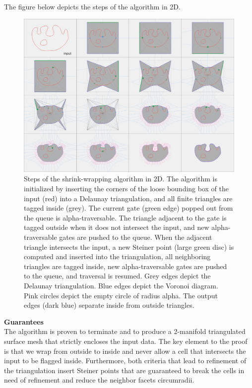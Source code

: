 \documentclass[12pt]{article}
\begin{document}
The figure below depicts the steps of the algorithm in 2D.
\begin{figure}[H]
    \centering
        \centering
        \includegraphics[width=\textwidth]{images/aw3_steps.jpg}
        \caption{Steps of the shrink-wrapping algorithm in 2D. The algorithm is initialized by
        inserting the corners of the loose bounding box of the input (red) into a Delaunay
        triangulation, and all finite triangles are tagged inside (grey). The current gate
        (green edge) popped out from the queue is alpha-traversable. The triangle adjacent
        to the gate is tagged outside when it does not intersect the input, and new
        alpha-traversable gates are pushed to the queue. When the adjacent triangle
        intersects the input, a new Steiner point (large green disc) is computed and inserted
        into the triangulation, all neighboring triangles are tagged inside, new
        alpha-traversable gates are pushed to the queue, and traversal is resumed. Grey edges
        depict the Delaunay triangulation. Blue edges depict the Voronoi diagram. Pink circles
        depict the empty circle of radius alpha. The output edges (dark blue) separate inside
        from outside triangles.
        }
\end{figure}

\textbf{Guarantees} \\
The algorithm is proven to terminate and to produce a 2-manifold triangulated surface
mesh that strictly encloses the input data. The key element to the proof is that we wrap
from outside to inside and never allow a cell that intersects the input to be flagged
inside. Furthermore, both criteria that lead to refinement of the triangulation insert
Steiner points that are guaranteed to break the cells in need of refinement and
reduce the neighbor facets circumradii.
\end{document}
